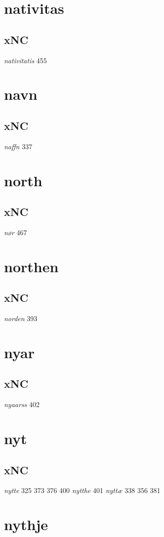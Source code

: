 \documentclass[a4paper,twocolumn]{article}
\begin{document}
\section{nativitas}
\label{sec:org83c345c}
\subsection{xNC}
\label{sec:org950f4f8}
\emph{nativitatis} 455 
\section{navn}
\label{sec:orga0034fb}
\subsection{xNC}
\label{sec:org877e4bc}
\emph{naffn} 337 
\section{north}
\label{sec:org95214c9}
\subsection{xNC}
\label{sec:orgc43ee94}
\emph{nør} 467 
\section{northen}
\label{sec:orgcc54995}
\subsection{xNC}
\label{sec:org12959b2}
\emph{norden} 393 
\section{nyar}
\label{sec:orga0df971}
\subsection{xNC}
\label{sec:org18342db}
\emph{nyaarss} 402 
\section{nyt}
\label{sec:org5318ecf}
\subsection{xNC}
\label{sec:orga35e154}
\emph{nytte} 325 373 376 400 \emph{nytthe} 401 \emph{nyttæ} 338 356 381 
\section{nythje}
\label{sec:orgfc9174d}
\end{document}

